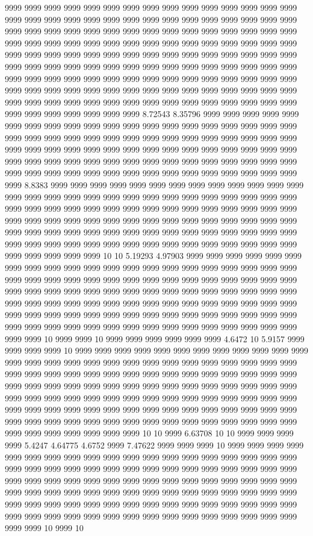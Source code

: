 9999 9999 9999 9999 9999 9999 9999 9999 9999 9999 9999 9999 9999 9999 9999 9999 9999 9999 9999 9999 9999 9999 9999 9999 9999 9999 9999 9999 9999 9999 9999 9999 9999 9999 9999 9999 9999 9999 9999 9999 9999 9999 9999 9999 9999 9999 9999 9999 9999 9999 9999 9999 9999 9999 9999 9999 9999 9999 9999 9999 9999 9999 9999 9999 9999 9999 9999 9999 9999 9999 9999 9999 9999 9999 9999 9999 9999 9999 9999 9999 9999 9999 9999 9999 9999 9999 9999 9999 9999 9999 9999 9999 9999 9999 9999 9999 9999 9999 9999 9999 9999 9999 9999 9999 9999 9999 9999 9999 9999 9999 9999 9999 9999 9999 9999 9999 9999 9999 9999 9999 9999 9999 9999 9999 9999 9999 9999 9999 9999 9999 9999 9999 9999 9999 9999 9999 9999 9999 9999 9999 9999 9999 8.72543 8.35796 9999 9999 9999 9999 9999 9999 9999 9999 9999 9999 9999 9999 9999 9999 9999 9999 9999 9999 9999 9999 9999 9999 9999 9999 9999 9999 9999 9999 9999 9999 9999 9999 9999 9999 9999 9999 9999 9999 9999 9999 9999 9999 9999 9999 9999 9999 9999 9999 9999 9999 9999 9999 9999 9999 9999 9999 9999 9999 9999 9999 9999 9999 9999 9999 9999 9999 9999 9999 9999 9999 9999 9999 9999 9999 9999 9999 9999 9999 9999 9999 9999 8.8383 9999 9999 9999 9999 9999 9999 9999 9999 9999 9999 9999 9999 9999 9999 9999 9999 9999 9999 9999 9999 9999 9999 9999 9999 9999 9999 9999 9999 9999 9999 9999 9999 9999 9999 9999 9999 9999 9999 9999 9999 9999 9999 9999 9999 9999 9999 9999 9999 9999 9999 9999 9999 9999 9999 9999 9999 9999 9999 9999 9999 9999 9999 9999 9999 9999 9999 9999 9999 9999 9999 9999 9999 9999 9999 9999 9999 9999 9999 9999 9999 9999 9999 9999 9999 9999 9999 9999 9999 9999 9999 9999 9999 9999 10 10 5.19293 4.97903 9999 9999 9999 9999 9999 9999 9999 9999 9999 9999 9999 9999 9999 9999 9999 9999 9999 9999 9999 9999 9999 9999 9999 9999 9999 9999 9999 9999 9999 9999 9999 9999 9999 9999 9999 9999 9999 9999 9999 9999 9999 9999 9999 9999 9999 9999 9999 9999 9999 9999 9999 9999 9999 9999 9999 9999 9999 9999 9999 9999 9999 9999 9999 9999 9999 9999 9999 9999 9999 9999 9999 9999 9999 9999 9999 9999 9999 9999 9999 9999 9999 9999 9999 9999 9999 9999 9999 9999 9999 9999 9999 9999 9999 9999 9999 9999 9999 9999 10 9999 9999 10 9999 9999 9999 9999 9999 9999 4.6472 10 5.9157 9999 9999 9999 9999 10 9999 9999 9999 9999 9999 9999 9999 9999 9999 9999 9999 9999 9999 9999 9999 9999 9999 9999 9999 9999 9999 9999 9999 9999 9999 9999 9999 9999 9999 9999 9999 9999 9999 9999 9999 9999 9999 9999 9999 9999 9999 9999 9999 9999 9999 9999 9999 9999 9999 9999 9999 9999 9999 9999 9999 9999 9999 9999 9999 9999 9999 9999 9999 9999 9999 9999 9999 9999 9999 9999 9999 9999 9999 9999 9999 9999 9999 9999 9999 9999 9999 9999 9999 9999 9999 9999 9999 9999 9999 9999 9999 9999 9999 9999 9999 9999 9999 9999 9999 9999 9999 9999 9999 9999 9999 9999 9999 9999 9999 10 10 9999 6.63708 10 10 9999 9999 9999 9999 5.4247 4.64775 4.6752 9999 7.47622 9999 9999 9999 10 9999 9999 9999 9999 9999 9999 9999 9999 9999 9999 9999 9999 9999 9999 9999 9999 9999 9999 9999 9999 9999 9999 9999 9999 9999 9999 9999 9999 9999 9999 9999 9999 9999 9999 9999 9999 9999 9999 9999 9999 9999 9999 9999 9999 9999 9999 9999 9999 9999 9999 9999 9999 9999 9999 9999 9999 9999 9999 9999 9999 9999 9999 9999 9999 9999 9999 9999 9999 9999 9999 9999 9999 9999 9999 9999 9999 9999 9999 9999 9999 9999 9999 9999 9999 9999 9999 9999 9999 9999 9999 9999 9999 9999 9999 9999 9999 10 9999 10 